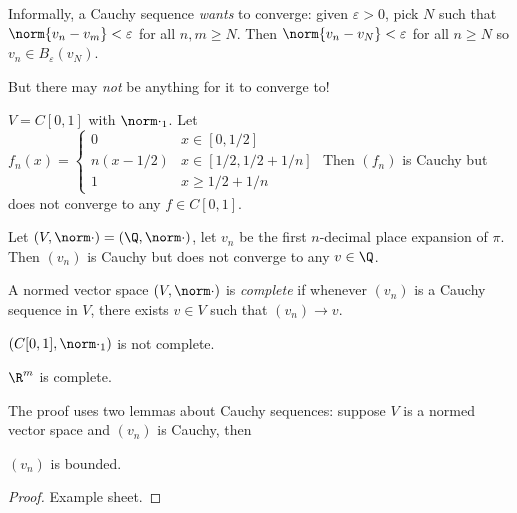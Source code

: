 \documentclass[a4paper]{article}
\theoremstyle{definition}
\begin{document}
Informally, a Cauchy sequence \emph{wants} to converge: given \(\varepsilon>0\), pick \(N\) such that \(\norm{v_n-v_m}< \varepsilon\) for all \(n,m\geq N\). Then \(\norm{v_n-v_N} < \varepsilon\) for all \(n\geq N\) so \(v_n \in B_\varepsilon(v_N)\).

But there may \emph{not} be anything for it to converge to!

\begin{eg}
  \(V = C[0,1]\) with \(\norm \cdot_1\). Let \(f_n(x) =
  \begin{cases}
    0 & x\in[0,1/2] \\
    n(x-1/2) & x\in[1/2,1/2+1/n] \\
    1 & x\geq 1/2+1/n
  \end{cases}
  \) Then \((f_n)\) is Cauchy but does not converge to any \(f\in C[0,1]\).
\end{eg}

\begin{eg}
  Let \((V, \norm \cdot) = (\Q, \norm \cdot)\), let \(v_n\) be the first \(n\)-decimal place expansion of \(\pi\). Then \((v_n)\) is Cauchy but does not converge to any \(v\in \Q\).
\end{eg}

\begin{definition}[Completeness]
  A normed vector space \((V, \norm \cdot)\) is \emph{complete} if whenever \((v_n)\) is a Cauchy sequence in \(V\), there exists \(v\in V\) such that \((v_n) \to v\).
\end{definition}

\begin{eg}
  \((C[0, 1], \norm \cdot_1)\) is not complete.
\end{eg}

\begin{theorem}
  \label{thm:completeness of R}
  \(\R^m\) is complete.
\end{theorem}

The proof uses two lemmas about Cauchy sequences: suppose \(V\) is a normed vector space and \((v_n)\) is Cauchy, then

\begin{lemma}
  \label{lem:boundedness of Cauchy}
  \((v_n)\) is bounded.
\end{lemma}

\begin{proof}
  Example sheet.
\end{proof}
\end{document}
